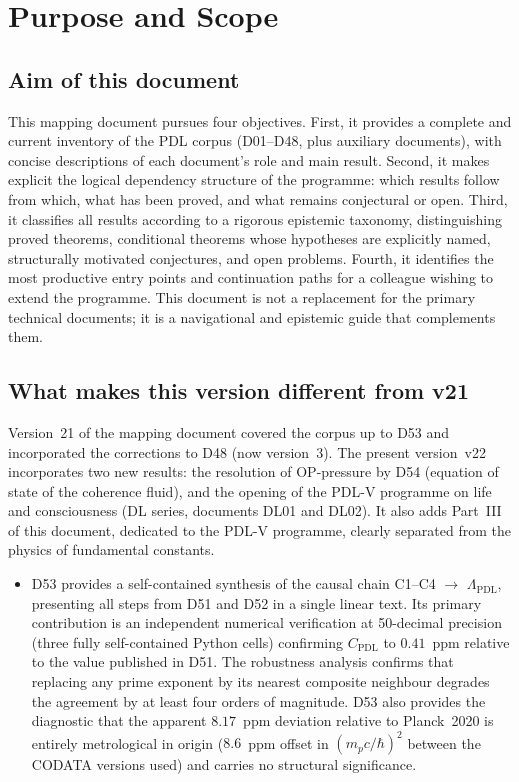 \documentclass[11pt,a4paper]{article}
\theoremstyle{plain}
\theoremstyle{definition}
\theoremstyle{remark}
\begin{document}
\clearpage

\tableofcontents

\clearpage

\section{Purpose and Scope}
\label{sec:purpose}

\subsection{Aim of this document}
\label{subsec:aim}
This mapping document pursues four objectives. First, it provides a complete and current inventory of the PDL corpus (D01--D48, plus auxiliary documents), with concise descriptions of each document's role and main result. Second, it makes explicit the logical dependency structure of the programme: which results follow from which, what has been proved, and what remains conjectural or open. Third, it classifies all results according to a rigorous epistemic taxonomy, distinguishing proved theorems, conditional theorems whose hypotheses are explicitly named, structurally motivated conjectures, and open problems. Fourth, it identifies the most productive entry points and continuation paths for a colleague wishing to extend the programme. This document is not a replacement for the primary technical documents; it is a navigational and epistemic guide that complements them.

\subsection{What makes this version different from v21}
\label{subsec:diffv21}
Version~21 of the mapping document covered the corpus up to D53 and incorporated the corrections to D48 (now version~3). The present version~v22 incorporates two new results: the resolution of OP-pressure by D54 (equation of state of the coherence fluid), and the opening of the PDL-V programme on life and consciousness (DL series, documents DL01 and DL02). It also adds Part~III of this document, dedicated to the PDL-V programme, clearly separated from the physics of fundamental constants.

\begin{itemize}
\item D53 provides a self-contained synthesis of the causal chain C1--C4 $\to$ $\Lambda_{\mathrm{PDL}}$, presenting all steps from D51 and D52 in a single linear text. Its primary contribution is an independent numerical verification at 50-decimal precision (three fully self-contained Python cells) confirming $C_{\mathrm{PDL}}$ to $0.41$~ppm relative to the value published in D51. The robustness analysis confirms that replacing any prime exponent by its nearest composite neighbour degrades the agreement by at least four orders of magnitude. D53 also provides the diagnostic that the apparent $8.17$~ppm deviation relative to Planck~2020 is entirely metrological in origin ($8.6$~ppm offset in $(m_p c/\hbar)^2$ between the CODATA versions used) and carries no structural significance.
\end{itemize}
\end{document}
